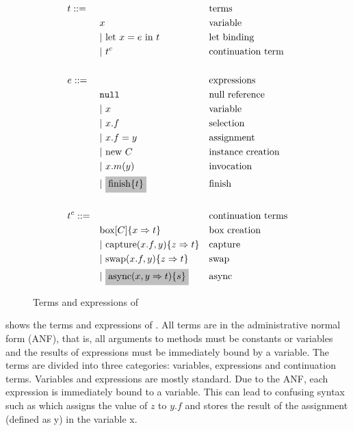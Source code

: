 \begin{figure}
    \centering
    \begin{alignat*}{3}
        &t ::= && && \text{terms}\\
        & &&x && \text{variable}\\
        & && |\ \text{let}\ x = e\ \text{in}\ t\ \ && \text{let binding}\\
        & && |\ t^c && \text{continuation term}\\
        &\\
        &e ::= && && \text{expressions}\\
        & && \mn{null} && \text{null reference}\\
        & &&|\ x && \text{variable}\\
        & &&|\ x.f && \text{selection}\\
        & &&|\ x.f = y && \text{assignment}\\
        & &&|\ \text{new}\ C && \text{instance creation}\\
        & &&|\ x.m(y) && \text{invocation}\\
        & &&|\ \graybox*{\text{finish} \{ t \}} && \text{finish}\\
        &\\
        &t^c ::= && && \text{continuation terms}\\
        & && \text{box}[C] \{ x \Rightarrow t \} && \text{box creation}\\
        & &&|\ \text{capture}(x.f, y) \{ z \Rightarrow t \} && \text{capture}\\
        & &&|\ \text{swap}(x.f, y) \{ z \Rightarrow t \} && \text{swap}\\
        & &&|\ \graybox*{\text{async}(x, y \Rightarrow t) \{ s \}} && \text{async}\\
    \end{alignat*}
    
    \caption{Terms and expressions of \plc}
    \label{fig:terms_and_expressions}
\end{figure}

 shows the terms and expressions of \plc. All terms are in the administrative normal form (ANF), that is, all arguments to methods must be constants or variables and the results of expressions must be immediately bound by a variable. The terms are divided into three categories: variables, expressions and continuation terms. Variables and expressions are mostly standard. Due to the ANF, each expression is immediately bound to a variable. This can lead to confusing syntax such as  which assigns the value of $z$ to $y.f$ and stores the result of the assignment (defined as y) in the variable x.

